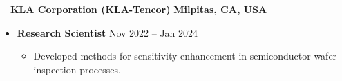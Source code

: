 ~~{\color{black}\textbf{KLA Corporation (KLA-Tencor)} \hfill  \textbf{Milpitas, CA, USA}}\par
\begin{itemize}
    \item
        \textbf{Research Scientist}
        \hfill  {Nov 2022 -- Jan 2024} \par
        \begin{itemize}
            \item Developed methods for sensitivity enhancement in semiconductor wafer inspection processes. 
        \end{itemize}
\end{itemize}